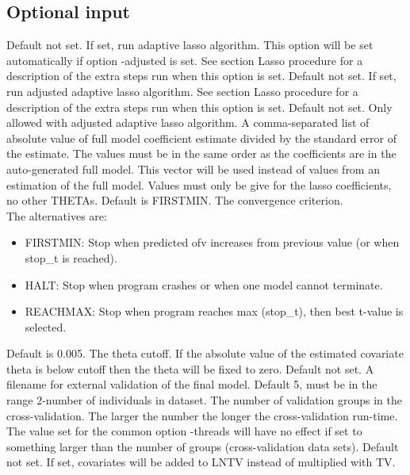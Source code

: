 \subsection{Optional input}
\begin{optionlist}
Default not set. If set, run adaptive lasso algorithm. This option will be set automatically if option -adjusted is set. See section Lasso procedure for a description of the extra steps run when this option is set.
\nextopt
{}
Default not set. If set, run adjusted adaptive lasso algorithm. See section Lasso procedure for a description of the extra steps run when this option is set.
\nextopt
{}
Default not set. Only allowed with adjusted adaptive lasso algorithm. A comma-separated list of absolute value of full model coefficient estimate divided by the standard error of the estimate. The values must be in the same order as the coefficients are in the auto-generated
full model. This vector will be used instead of values from an estimation of the full model. Values must only be give for the lasso coefficients, no other THETAs.
\nextopt
{}
Default is FIRSTMIN. The convergence criterion.\\ 
The alternatives are:
\begin{itemize} 
	\item FIRSTMIN: Stop when predicted ofv increases from previous value (or when stop\_t is reached). 
	\item HALT: Stop when program crashes or when one model cannot terminate. 
	\item REACHMAX: Stop when program reaches max (stop\_t), then best t-value is selected. 
	\end{itemize}
\nextopt
{}
Default is 0.005. The theta cutoff. If the absolute value of the estimated covariate theta is below cutoff then the theta will be fixed to zero. 
\nextopt
{}
Default not set. A filename for external validation of the final model.
\nextopt
{}
Default 5, must be in the range 2-number of individuals in dataset. The number of validation groups in the cross-validation. The larger the number the longer the cross-validation run-time. The value set for the common option -threads will have no effect if set to something larger than the number of groups (cross-validation data sets).
\nextopt
{}
Default not set. If set, covariates will be added to LNTV instead of multiplied with TV. 

\end{optionlist}
